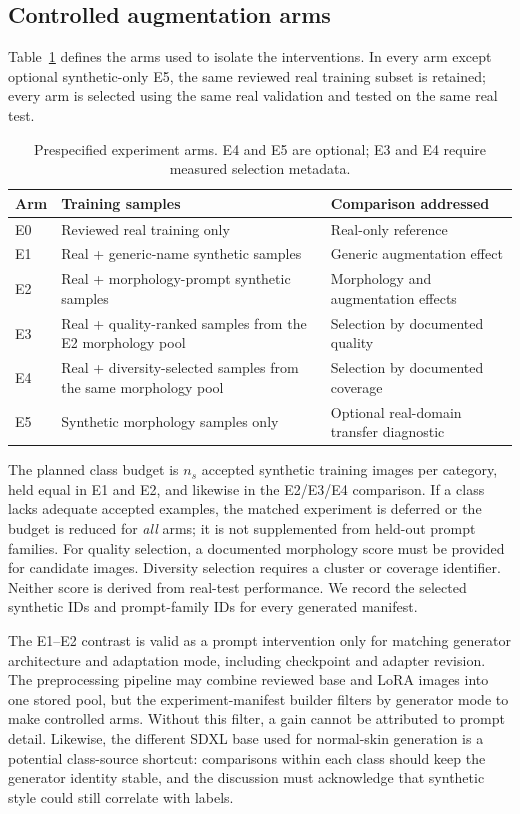 \subsection{Controlled augmentation arms}
Table~\ref{tab:arms} defines the arms used to isolate the interventions. In every arm except optional synthetic-only E5, the same reviewed real training subset is retained; every arm is selected using the same real validation and tested on the same real test.

\begin{table}[ht]
\centering\small
\caption{Prespecified experiment arms. E4 and E5 are optional; E3 and E4 require measured selection metadata.}
\label{tab:arms}
\begin{tabularx}{\linewidth}{@{}lX X@{}}
\toprule
Arm & Training samples & Comparison addressed\\\midrule
E0 & Reviewed real training only & Real-only reference\\
E1 & Real + generic-name synthetic samples & Generic augmentation effect\\
E2 & Real + morphology-prompt synthetic samples & Morphology and augmentation effects\\
E3 & Real + quality-ranked samples from the E2 morphology pool & Selection by documented quality\\
E4 & Real + diversity-selected samples from the same morphology pool & Selection by documented coverage\\
E5 & Synthetic morphology samples only & Optional real-domain transfer diagnostic\\
\bottomrule
\end{tabularx}
\end{table}

The planned class budget is $n_s$ accepted synthetic training images per category, held equal in E1 and E2, and likewise in the E2/E3/E4 comparison. If a class lacks adequate accepted examples, the matched experiment is deferred or the budget is reduced for \emph{all} arms; it is not supplemented from held-out prompt families. For quality selection, a documented morphology score must be provided for candidate images. Diversity selection requires a cluster or coverage identifier. Neither score is derived from real-test performance. We record the selected synthetic IDs and prompt-family IDs for every generated manifest.

The E1--E2 contrast is valid as a prompt intervention only for matching generator architecture and adaptation mode, including checkpoint and adapter revision. The preprocessing pipeline may combine reviewed base and LoRA images into one stored pool, but the experiment-manifest builder filters by generator mode to make controlled arms. Without this filter, a gain cannot be attributed to prompt detail. Likewise, the different SDXL base used for normal-skin generation is a potential class-source shortcut: comparisons within each class should keep the generator identity stable, and the discussion must acknowledge that synthetic style could still correlate with labels.

